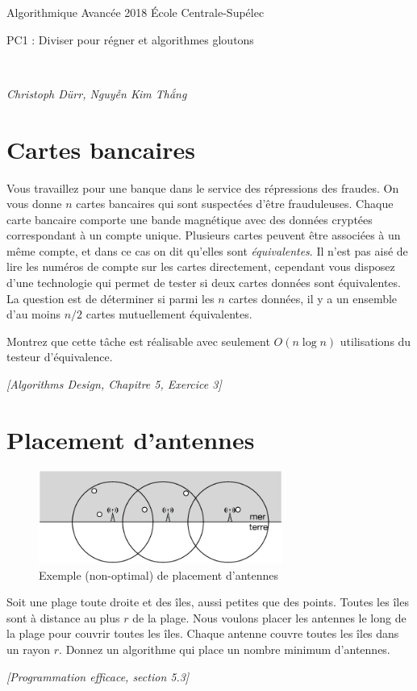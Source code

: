 \documentclass[12pt]{article}
\newcommand{\source}[1]{\begin{flushright}\emph{[#1]}\end{flushright}}
\newcommand{\MakeScribeTop}[1]{
\noindent
\begin{framed}
\noindent
 Algorithmique Avancée 2018
 \hfill
 École Centrale-Supélec
 \\[1em]
 \centerline{ \Large
#1
 }
 \\[1em]
\centerline{  \it Christoph Dürr, Nguyễn Kim Thắng}
\end{framed}
}
\begin{document}
    \MakeScribeTop{PC1 : Diviser pour régner et algorithmes gloutons}

    \section{Cartes bancaires}



    Vous travaillez pour une banque dans le service des répressions des fraudes.  On vous donne $n$ cartes bancaires qui sont suspectées d'être frauduleuses. Chaque carte bancaire comporte une bande magnétique avec des données cryptées correspondant à un compte unique. Plusieurs cartes peuvent être associées à un même compte, et dans ce cas on dit qu'elles sont \emph{équivalentes}.
    Il n'est pas aisé de lire les numéros de compte sur les cartes directement, cependant
    vous disposez d'une technologie qui permet de tester si deux cartes données sont équivalentes.
    La question est de déterminer si parmi les $n$ cartes données, il y a un ensemble d'au moins $n/2$ cartes mutuellement équivalentes.

    Montrez que cette tâche est réalisable avec seulement $O(n \log n)$ utilisations du testeur d'équivalence.

\source{Algorithms Design, Chapitre 5, Exercice 3}

    \section{Placement d'antennes}


\begin{figure}[h]
\centerline{\includegraphics[width=8cm]{radar-disc}}
\caption{Exemple (non-optimal) de placement d'antennes}
\end{figure}

Soit une plage toute droite et des îles, aussi petites que des points.
Toutes les îles sont à distance au plus $r$ de la plage.
Nous voulons placer les antennes le long de la plage pour couvrir toutes les îles.
Chaque antenne couvre toutes les îles dans un rayon $r$.
Donnez un algorithme qui place un nombre minimum d'antennes.

\source{Programmation efficace, section 5.3}
\end{document}
